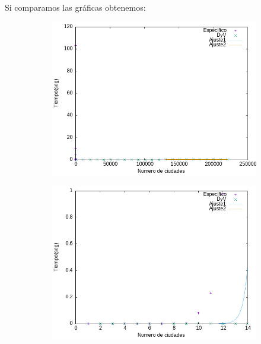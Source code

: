 \documentclass{article}
\begin{document}
    Si comparamos las gráficas obtenemos: 

    \begin{figure}[H]
        \begin{subfigure}{0.4\textwidth}
            \centering
            \includegraphics[scale = 0.40]{P3/Umbral/Salida_comparativa.jpeg}
        \end{subfigure} \hfill
        \begin{subfigure}{0.4\textwidth}
            \centering
            \includegraphics[scale = 0.40]{P3/Umbral/Salida_comparativa1.jpeg}
        \end{subfigure}
    \end{figure}
\end{document}
